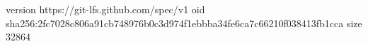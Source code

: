version https://git-lfs.github.com/spec/v1
oid sha256:2fc7028c806a91cb748976b0c3d974f1ebbba34fe6ca7c66210f038413fb1cca
size 32864

